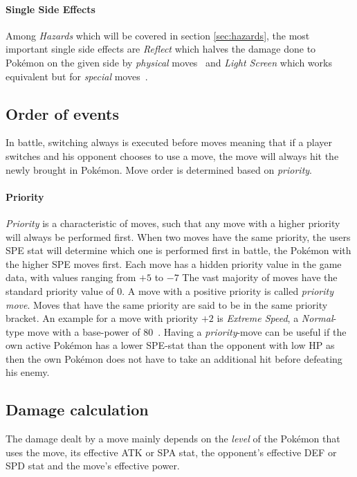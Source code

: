 \paragraph{Single Side Effects}
Among \textit{Hazards} which will be covered in section \ref{sec:hazards}, the most important single side
effects are \textit{Reflect} which halves the damage done to Pokémon on the given side by \textit{physical}
moves~\autocite{Bulbapedia:Reflect} and \textit{Light Screen} which works
equivalent but for \textit{special} moves~\autocite{Bulbapedia:LightScreen}.

\subsection{Order of events}
\label{sec:order-of-events}
In battle, switching always is executed before moves meaning that if a player switches and his opponent chooses
to use a move, the move will always hit the newly brought in Pokémon. Move order is determined based on
\textit{priority}.
\paragraph{Priority}
\textit{Priority} is a characteristic of moves, such that any move with a higher priority will always be
performed first. When two moves have the same priority, the users \ac{SPE} stat will determine which
one is performed first in battle, the Pokémon with the higher \ac{SPE} moves first. 
Each move has a hidden priority value in the game data, with values ranging
from $+5$ to $-7$ The vast majority of moves have the standard priority value of 0. A move with a positive
priority is called \textit{priority move}. Moves that have the same priority are said to be in the same
priority bracket. An example for a move with priority $+2$ is \textit{Extreme Speed}, a \textit{Normal}-type
move with a base-power of $80$~\autocite{Bulbapedia:ExtremeSpeed}. Having
a \textit{priority}-move can be useful if the own active Pokémon has a lower \ac{SPE}-stat than the 
opponent with low \ac{HP} as then the own Pokémon does not have to take an additional hit before defeating
his enemy. 

\subsection{Damage calculation}
\label{sec:damage-calculation}
The damage dealt by a move mainly depends on the \textit{level} of the Pokémon
that uses the move, its effective \ac{ATK} or \ac{SPA} stat, the
opponent's effective \ac{DEF} or \ac{SPD} stat and the move's effective
power. 

